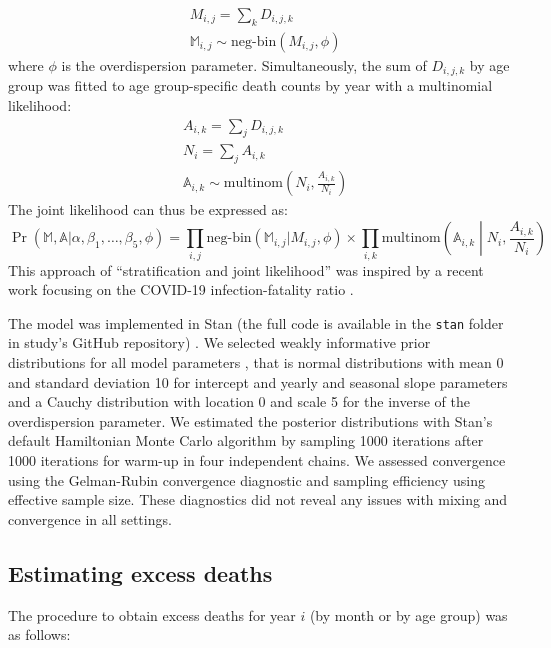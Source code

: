 \documentclass{article}
\begin{document}
	\begin{align}
		&M_{i,j} = \sum_k D_{i,j,k} \\
		&\mathds{M}_{i,j} \sim \text{neg-bin}\left(M_{i,j},\phi\right)
	\end{align}
	where $\phi$ is the overdispersion parameter.
	Simultaneously, the sum of $D_{i,j,k}$ by age group was fitted to age group-specific death counts by year with a multinomial likelihood:
	\begin{align}
		&A_{i,k} = \sum_j D_{i,j,k} \\
		&N_i = \sum_j A_{i,k} \\
		&\mathds{A}_{i,k} \sim \text{multinom}\left(N_i, \frac{A_{i,k}}{N_i}\right)
	\end{align}
	The joint likelihood can thus be expressed as:
	\begin{equation}
		\Pr(\mathds{M},\mathds{A} | \alpha, \beta_1, \ldots, \beta_5,\phi) = \prod_{i,j} \text{neg-bin}\left(\mathds{M}_{i,j} | M_{i,j},\phi\right) \times \prod_{i,k} \text{multinom}\left(\mathds{A}_{i,k} \middle| N_i, \frac{A_{i,k}}{N_i}\right)
	\end{equation}
	This approach of ``stratification and joint likelihood'' was inspired by a recent work focusing on the COVID-19 infection-fatality ratio \cite{hauser2020}.
	
	The model was implemented in Stan (the full code is available in the \texttt{stan} folder in study's GitHub repository) \cite{carpenter2017}. We selected weakly informative prior distributions for all model parameters \cite{gelman2020regression,gelman2008weakly}, that is normal distributions with mean 0 and standard deviation 10 for intercept and yearly and seasonal slope parameters and a Cauchy distribution with location 0 and scale 5 for the inverse of the overdispersion parameter. We estimated the posterior distributions with Stan's default Hamiltonian Monte Carlo algorithm \cite{hoffman2014no} by sampling 1000 iterations after 1000 iterations for warm-up in four independent chains. We assessed convergence using the Gelman-Rubin convergence diagnostic and sampling efficiency using effective sample size. These diagnostics did not reveal any issues with mixing and convergence in all settings.
	
	\subsection{Estimating excess deaths}
	
	The procedure to obtain excess deaths for year $i$ (by month or by age group) was as follows:
	
\end{document}

